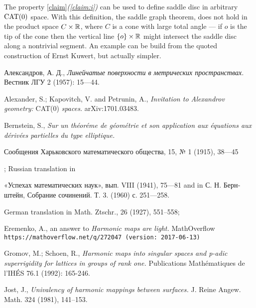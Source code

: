 \documentclass{article}
\begin{document}
The property \ref{claim}\textit{(\ref{claim:i})} can be used to define saddle disc in arbitrary $\mathop{\rm CAT}\nolimits(0)$ space.
With this definition, the saddle graph theorem, does not hold in the product space $C\times \mathbb{R}$, where $C$ is a cone with large total angle --- if $o$ is the tip of the cone then the vertical line $\{o\}\times\mathbb{R}$ might intersect the saddle disc along a nontrivial segment.
An example can be build from the quoted construction of Ernst Kuwert, but actually simpler.


\begin{thebibliography}{52}

 \begin{otherlanguage}{russian}
Александров, А. Д., 
\textit{Линейчатые поверхности в метрических пространствах.}
Вестник ЛГУ 2 (1957): 15---44.
\end{otherlanguage}

Alexander, S.; Kapovitch, V. and Petrunin, A.,
\textit{Invitation to Alexandrov geometry:} CAT(0) \textit{spaces.}
arXiv:1701.03483.

Bernstein, S., \textit{Sur un th\'{e}or\'{e}me de g\'{e}om\'{e}trie et son application aux \'{e}quations aux d\'{e}riv\'{e}es partielles du type elliptique.}
\begin{otherlanguage}{russian}
Сообщения Харьковского математического общества, 15, № 1 (1915), 38---45
\end{otherlanguage};
Russian translation in 
\begin{otherlanguage}{russian}
«Успехах математических наук», вып. VIII (1941), 75---81
and in С. Н. Бернштейн, Собрание сочинений. Т. 3. (1960) с. 251---258.
\end{otherlanguage}
German translation in Math. Ztschr., 26 (1927), 551--558;


 Eremenko, A., 
an answer to \textit{Harmonic maps are light.} MathOverflow
\texttt{https://mathoverflow.net/q/272047 (version: 2017-06-13)}

 Gromov, M.; Schoen, R., 
\textit{Harmonic maps into singular spaces and p-adic superrigidity for lattices in groups of rank one.} 
Publications Mathématiques de l'IHÉS 76.1 (1992): 165-246.

 Jost, J.,
\textit{Univalency of harmonic mappings between surfaces.}
J. Reine Angew. Math. 324 (1981), 141--153.


\end{thebibliography}
\end{document}
